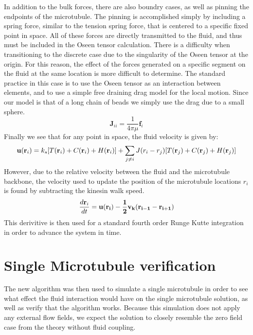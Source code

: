 \documentclass[11pt]{ucthesis}
\def\br{{\bf r}}
\begin{document}
{In addition to the bulk forces, there are also boundry cases, as well as pinning the endpoints of the microtubule. The pinning is accomplished simply by including a spring force, similar to the tension spring force, that is centered to a specific fixed point in space.
All of these forces are directly transmitted to the fluid, and thus must be included in the Oseen tensor calculation. There is a difficulty when transitioning to the discrete case due to the singularity of the Oseen tensor at the origin. 
For this reason, the effect of the forces generated on a specific segment on the fluid at the same location is more difficult to determine.
The standard practice in this case is to use the Oseen tensor as an interaction between elements, and to use a simple free draining drag model for the local motion. Since our model is that of a long chain of beads we simply use the drag due to a small sphere.
\begin{equation}
\label{eq:discretesum}
\mathbf{J}_{ii} = \frac{1}{4\pi\mu} \mathbf{f}_i
\end{equation}
Finally we see that for any point in space, the fluid velocity is given by:
\begin{equation}
\label{eq:discretesum}
\mathbf{u}(\br_i) = k_s[T(\br_i) + C(\br_i) + H(\br_i)] + \sum_{j\neq i} J(r_i - r_j) [T(\br_j) + C(\br_j)+ H(\br_j)]
\end{equation}
However, due to the relative velocity between the fluid and the microtubule backbone, the velocity used to update the position of the microtubule locations $r_i$ is found by subtracting the kinesin walk speed.
\begin{equation}
\label{eq:discretevel}
\frac{d \br_i}{dt} = \bf u(\br_i) - \frac{1}{2}v_k (\br_{i-1} - \br_{i+1})
\end{equation}
This derivitive is then used for a standard fourth order Runge Kutte integration in order to advance the system in time.

\section{Single Microtubule verification}
The new algorithm was then used to simulate a single microtubule in order to see what effect the fluid interaction would have on the single microtubule solution, as well as verify that the algorithm works.
Because this simulation does not apply any external flow fields, we expect the solution to closely resemble the zero field case from the theory without fluid coupling.

}
\end{document}
